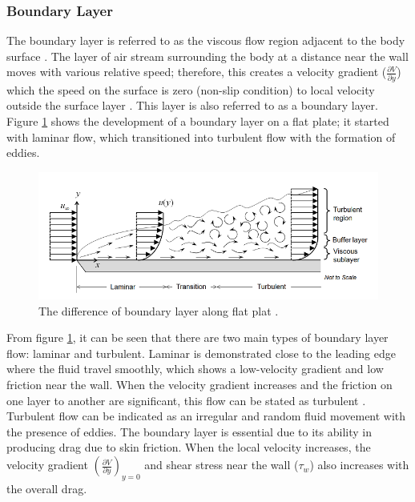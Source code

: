 \subsubsection{Boundary Layer}
The boundary layer is referred to as the viscous flow region adjacent to the body surface \cite{Anderson2010FundamentalsAerodynamics}. The layer of air stream surrounding the body at a distance near the wall moves with various relative speed; therefore, this creates a velocity gradient ($\frac{\partial V}{\partial y}$) which the speed on the surface is zero (non-slip condition) to local velocity outside the surface layer \cite{Scibor-Rylski1984RoadAerodynamics}. This layer is also referred to as a boundary layer. Figure \ref{fig:3} shows the development of a boundary layer on a flat plate; it started with laminar flow, which transitioned into turbulent flow with the formation of eddies.

\begin{figure}[!htb]
    \centering
    \includegraphics[scale=0.6]{Figures/BL_laminar_turbulent.png}
    \caption{The difference of boundary layer along flat plat \cite{Frei2017WhichApplication}.}
    \label{fig:3}
\end{figure}

 
\noindent From figure \ref{fig:3}, it can be seen that there are two main types of boundary layer flow: laminar and turbulent. Laminar is demonstrated close to the leading edge where the fluid travel smoothly, which shows a low-velocity gradient and low friction near the wall. When the velocity gradient increases and the friction on one layer to another are significant, this flow can be stated as turbulent \cite{Scibor-Rylski1984RoadAerodynamics}. Turbulent flow can be indicated as an irregular and random fluid movement with the presence of eddies. The boundary layer is essential due to its ability in producing drag due to skin friction. When the local velocity increases, the velocity gradient $(\frac{\partial V}{\partial y})_{y=0} $ and shear stress near the wall ($\tau_w $) also increases with the overall drag.

